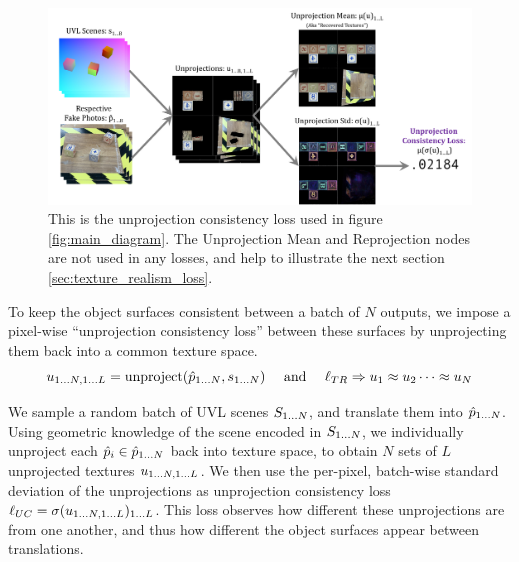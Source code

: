 \documentclass{article}
\begin{document}
	\begin{figure}[H]
		\begin{center}
			\includegraphics[width=400pt]{../images/unprojection_consistency_loss_without_reprojection.pdf}
		\end{center}
		\caption{
			This is the unprojection consistency loss used in figure \ref{fig:main_diagram}.
			The Unprojection Mean and Reprojection nodes are not used in any losses, and help to illustrate the next section \ref{sec:texture_realism_loss}.
		}
		\label{fig:unprojection_consistency_loss}
	\end{figure}

	To keep the object surfaces consistent between a batch of $N$ outputs, we impose a pixel-wise ``unprojection consistency loss'' between these surfaces by unprojecting them back into a common texture space.
	\begin{equation}
		u\toNL=\text{unproject}(\ph\toN,s\toN)\ \ \ \text{ and } \ \ \ \lTR \Rightarrow u_1 \approx u_2 \dots \approx u_N
	\end{equation}

	We sample a random batch of UVL scenes $S_{1\dots N}$, and translate them into $\hat{p}_{1\dots N}$.
	Using geometric knowledge of the scene encoded in $S_{1\dots N}$, we individually unproject each $\hat{p}_i \in \hat{p}_{1\dots N}$ back into texture space, to obtain $N$ sets of $L$ unprojected textures $u_{1\dots N, 1\dots L}$.
	We then use the per-pixel, batch-wise standard deviation of the unprojections as unprojection consistency loss $\ell_{UC} = \sigma(u_{1\dots N, 1\dots L})_{1\dots L}$.
	This loss observes how different these unprojections are from one another, and thus how different the object surfaces appear between translations. 
\end{document}
